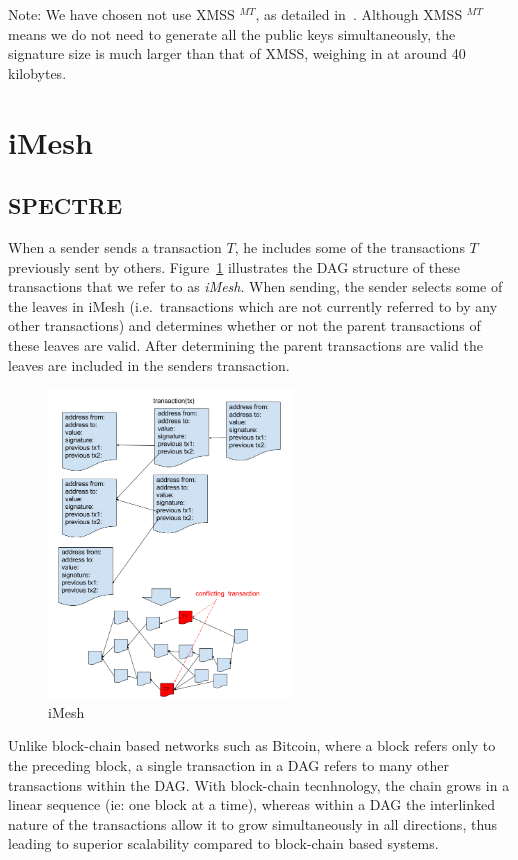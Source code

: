 \documentclass[a4paper,10pt,twocolumn]{article}
\begin{document}
Note: We have chosen not use XMSS \(^{MT}\), as detailed in~\cite{ietf}. Although XMSS \(^{MT}\) means we do not need to generate all 
the public keys simultaneously, the signature size is much larger than that of XMSS, weighing in at around 40 kilobytes.

\section{iMesh}
\label{sec:imesh}

\subsection{SPECTRE}
When a sender sends a transaction \(T\), he includes some of the transactions \(T\) previously sent by others. 
Figure~\ref{fig:imesh} illustrates the DAG structure of these transactions that we refer to as \emph{iMesh}. When sending,
the sender selects some of the leaves in iMesh (i.e.\ transactions which are not currently referred to by any other transactions) and 
determines whether or not the parent transactions of these leaves are valid. After determining the parent transactions are valid the 
leaves are included in the senders transaction.

\begin{figure}[ht]
	\begin{center}
	\includegraphics[width=65mm]{dag.png}
	  \caption{iMesh}
    \label{fig:imesh}
	\end{center}
 \end{figure}

Unlike block-chain based networks such as Bitcoin, where a block refers only to the preceding block, a single transaction in a DAG 
refers to many other transactions within the DAG. With block-chain tecnhnology, the chain grows in a linear sequence (ie: one block at a 
time), whereas within a DAG the interlinked nature of the transactions allow it to grow simultaneously in all directions, thus leading 
to superior scalability compared to block-chain based systems.
\end{document}
